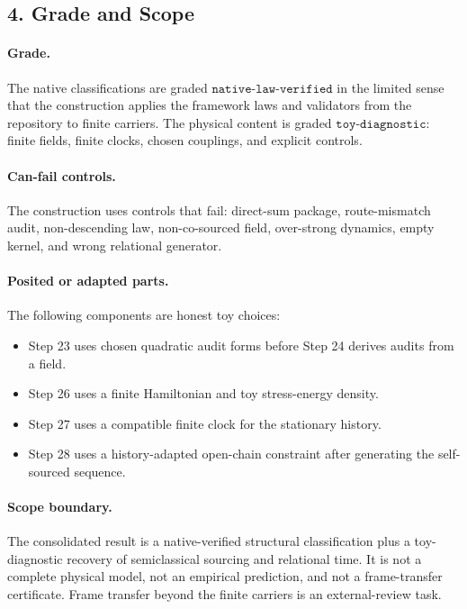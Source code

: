 \subsection*{4. Grade and Scope}

\paragraph{Grade.}
The native classifications are graded \(\texttt{native-law-verified}\) in the
limited sense that the construction applies the framework laws and validators
from the repository to finite carriers.  The physical content is graded
\(\texttt{toy-diagnostic}\): finite fields, finite clocks, chosen couplings,
and explicit controls.

\paragraph{Can-fail controls.}
The construction uses controls that fail: direct-sum package, route-mismatch
audit, non-descending law, non-co-sourced field, over-strong dynamics, empty
kernel, and wrong relational generator.

\paragraph{Posited or adapted parts.}
The following components are honest toy choices:
\begin{itemize}
\item Step 23 uses chosen quadratic audit forms before Step 24 derives audits
  from a field.
\item Step 26 uses a finite Hamiltonian and toy stress-energy density.
\item Step 27 uses a compatible finite clock for the stationary history.
\item Step 28 uses a history-adapted open-chain constraint after generating
  the self-sourced sequence.
\end{itemize}

\paragraph{Scope boundary.}
The consolidated result is a native-verified structural classification plus a
toy-diagnostic recovery of semiclassical sourcing and relational time.  It is
not a complete physical model, not an empirical prediction, and not a
frame-transfer certificate.  Frame transfer beyond the finite carriers is an
external-review task.

